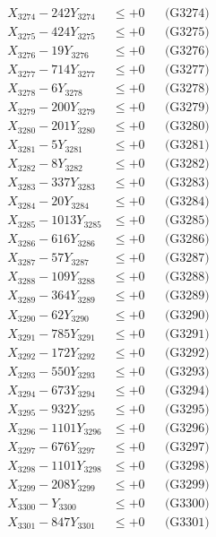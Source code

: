 \documentclass[a4paper,10pt]{article}
\begin{document}
{\begin{align}
X_{3274} - 242Y_{3274} &\leq +0 && \text{(G3274)} \\
X_{3275} - 424Y_{3275} &\leq +0 && \text{(G3275)} \\
X_{3276} - 19Y_{3276} &\leq +0 && \text{(G3276)} \\
X_{3277} - 714Y_{3277} &\leq +0 && \text{(G3277)} \\
X_{3278} - 6Y_{3278} &\leq +0 && \text{(G3278)} \\
X_{3279} - 200Y_{3279} &\leq +0 && \text{(G3279)} \\
X_{3280} - 201Y_{3280} &\leq +0 && \text{(G3280)} \\
\allowbreak
X_{3281} - 5Y_{3281} &\leq +0 && \text{(G3281)} \\
X_{3282} - 8Y_{3282} &\leq +0 && \text{(G3282)} \\
X_{3283} - 337Y_{3283} &\leq +0 && \text{(G3283)} \\
X_{3284} - 20Y_{3284} &\leq +0 && \text{(G3284)} \\
X_{3285} - 1013Y_{3285} &\leq +0 && \text{(G3285)} \\
X_{3286} - 616Y_{3286} &\leq +0 && \text{(G3286)} \\
X_{3287} - 57Y_{3287} &\leq +0 && \text{(G3287)} \\
X_{3288} - 109Y_{3288} &\leq +0 && \text{(G3288)} \\
X_{3289} - 364Y_{3289} &\leq +0 && \text{(G3289)} \\
X_{3290} - 62Y_{3290} &\leq +0 && \text{(G3290)} \\
\allowbreak
X_{3291} - 785Y_{3291} &\leq +0 && \text{(G3291)} \\
X_{3292} - 172Y_{3292} &\leq +0 && \text{(G3292)} \\
X_{3293} - 550Y_{3293} &\leq +0 && \text{(G3293)} \\
X_{3294} - 673Y_{3294} &\leq +0 && \text{(G3294)} \\
X_{3295} - 932Y_{3295} &\leq +0 && \text{(G3295)} \\
X_{3296} - 1101Y_{3296} &\leq +0 && \text{(G3296)} \\
X_{3297} - 676Y_{3297} &\leq +0 && \text{(G3297)} \\
X_{3298} - 1101Y_{3298} &\leq +0 && \text{(G3298)} \\
X_{3299} - 208Y_{3299} &\leq +0 && \text{(G3299)} \\
X_{3300} - Y_{3300} &\leq +0 && \text{(G3300)} \\
\allowbreak
X_{3301} - 847Y_{3301} &\leq +0 && \text{(G3301)} \\

\end{align}}
\end{document}
